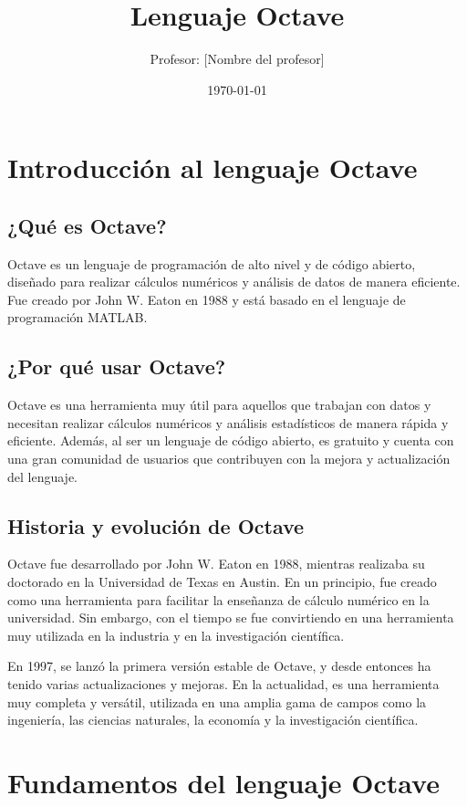 \documentclass{article}
\title{Lenguaje Octave}
\author{Profesor: [Nombre del profesor]}
\date{\today}
\begin{document}
\maketitle

\section{Introducción al lenguaje Octave}

\subsection{¿Qué es Octave?}
Octave es un lenguaje de programación de alto nivel y de código abierto, diseñado para realizar cálculos numéricos y análisis de datos de manera eficiente. Fue creado por John W. Eaton en 1988 y está basado en el lenguaje de programación MATLAB.

\subsection{¿Por qué usar Octave?}
Octave es una herramienta muy útil para aquellos que trabajan con datos y necesitan realizar cálculos numéricos y análisis estadísticos de manera rápida y eficiente. Además, al ser un lenguaje de código abierto, es gratuito y cuenta con una gran comunidad de usuarios que contribuyen con la mejora y actualización del lenguaje.

\subsection{Historia y evolución de Octave}
Octave fue desarrollado por John W. Eaton en 1988, mientras realizaba su doctorado en la Universidad de Texas en Austin. En un principio, fue creado como una herramienta para facilitar la enseñanza de cálculo numérico en la universidad. Sin embargo, con el tiempo se fue convirtiendo en una herramienta muy utilizada en la industria y en la investigación científica.

En 1997, se lanzó la primera versión estable de Octave, y desde entonces ha tenido varias actualizaciones y mejoras. En la actualidad, es una herramienta muy completa y versátil, utilizada en una amplia gama de campos como la ingeniería, las ciencias naturales, la economía y la investigación científica.

\section{Fundamentos del lenguaje Octave}
\end{document}
